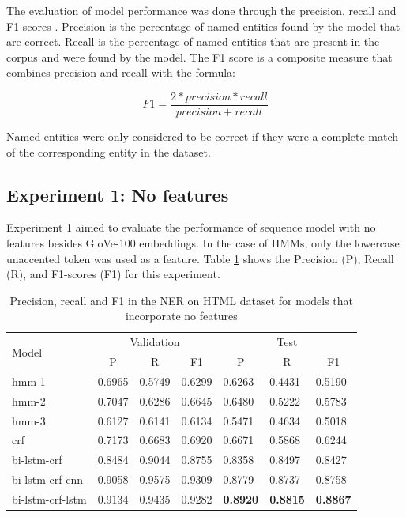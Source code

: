 \documentclass{nle}
\begin{document}
The evaluation of model performance was done through the precision, recall and 
F1 scores \cite{Rijsbergen1979}. Precision is the percentage of named entities found by 
the model that are correct. Recall is the percentage of named entities that are present
in the corpus and were found by the model. The F1 score is a composite measure that combines
precision and recall with the formula:

\begin{equation}
F1 = \frac{2 * precision * recall}{precision + recall}
\end{equation}

Named entities were only considered to be correct if they were a complete match of the 
corresponding entity in the dataset.

\subsection{Experiment 1: No features}

Experiment 1 aimed to evaluate the performance of sequence model with no features
besides GloVe-100 embeddings. In the case of HMMs, only the lowercase
unaccented token was used as a feature. Table \ref{tab:experiment1} 
shows the Precision (P), Recall (R), and F1-scores (F1) for this
experiment.

\begin{table}[h]
  \small
  \begin{center}
    \begin{tabular}{ lllllll }
      \toprule
      \multirow{2}{*}{Model} & \multicolumn{3}{c}{Validation} & \multicolumn{3}{c}{Test} \\
                             & \multicolumn{1}{c}{P} & \multicolumn{1}{c}{R} & \multicolumn{1}{c}{F1}
                             & \multicolumn{1}{c}{P} & \multicolumn{1}{c}{R} & \multicolumn{1}{c}{F1} \\
      \midrule
      hmm-1	       & 0.6965 & 0.5749 & 0.6299 & 0.6263 & 0.4431 & 0.5190 \\
      hmm-2	       & 0.7047 & 0.6286 & 0.6645 & 0.6480 & 0.5222 & 0.5783 \\
      hmm-3	       & 0.6127 & 0.6141 & 0.6134 & 0.5471 & 0.4634 & 0.5018 \\
      crf	       & 0.7173 & 0.6683 & 0.6920 & 0.6671 & 0.5868 & 0.6244 \\
      bi-lstm-crf      & 0.8484 & 0.9044 & 0.8755 & 0.8358 & 0.8497 & 0.8427 \\
      bi-lstm-crf-cnn  & 0.9058 & 0.9575 & 0.9309 & 0.8779 & 0.8737 & 0.8758 \\
      bi-lstm-crf-lstm & 0.9134 & 0.9435 & 0.9282 & \textbf{0.8920} & \textbf{0.8815} & \textbf{0.8867} \\
      \bottomrule
    \end{tabular}
  \end{center}
  \caption{Precision, recall and F1 in the NER on HTML dataset for models that incorporate no features}
  \label{tab:experiment1}
\end{table}
\end{document}
